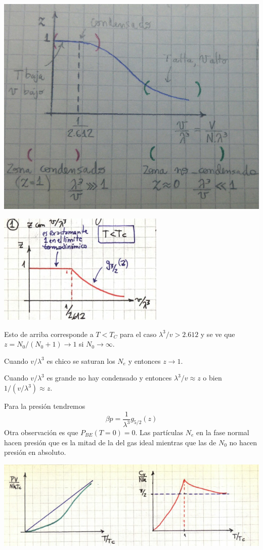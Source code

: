 \documentclass[10pt,oneside]{CBFT_book}
\begin{document}
\includegraphics[scale=0.3]{images/1625624660.jpg}

\includegraphics[scale=0.5]{images/1606329632.jpg}

Esto de arriba corresponde a $T < T_C $ para el caso $\lambda^3/v > 2.612 $ y se ve que 
$z = N_0/(N_0+1) \to 1$ si $N_0\to\infty$.

Cuando $v/\lambda^3$ es chico se saturan los $N_e$ y entonces $ z \to 1 $.

Cuando $v/\lambda^3$ es grande no hay condensado y entonces $ \lambda^3/v \approx z $ o bien
$ 1/ (v/\lambda^3) \approx z $.

Para la presión tendremos
\[
	\beta p = \frac{1}{\lambda^3} g_{5/2}(z)
\]
Otra observación es que $P_{BE}(T=0)=0$. Las partículas $N_e$ en la fase normal hacen presión que es la
mitad de la del gas ideal mientras que las de $N_0$ no hacen presión en absoluto.

\includegraphics[scale=0.4]{images/1606329638.jpg}
\end{document}
